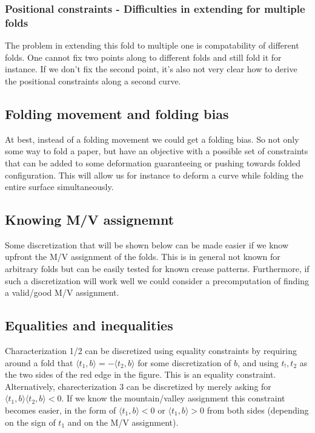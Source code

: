 \documentclass{article}
\theoremstyle{definition}
\begin{document}
\subsubsection{Positional constraints - Difficulties in extending for multiple folds}
The problem in extending this fold to multiple one is compatability of different folds. One cannot fix two points along to different folds and still fold it for instance. If we don't fix the second point, it's also not very clear how to derive the positional constraints along a second curve.

\subsection{Folding movement and folding bias}
At best, instead of a folding movement we could get a folding bias. So not only some way to fold a paper, but have an objective with a possible set of constraints that can be added to some deformation guaranteeing or pushing towards folded configuration. This will allow us for instance to deform a curve while folding the entire surface simultaneously.

\subsection{Knowing M/V assignemnt}
Some discretization that will be shown below can be made easier if we know upfront the M/V assignment of the folds. This is in general not known for arbitrary folds but can be easily tested for known crease patterns. Furthermore, if such a discretization will work well we could consider a precomputation of finding a valid/good M/V assignment.

\subsection{Equalities and inequalities}
Characterization 1/2 can be discretized using equality constraints by requiring around a fold that  $\langle t_1,b \rangle = -\langle t_2,b \rangle$ for some discretization of $b$, and using $t_!,t_2$ as the two sides of the red edge in the figure. This is an equality constraint. Alternatively, charecterization 3 can be discretized by merely asking for $\langle t_1,b \rangle \langle t_2,b \rangle < 0$. If we know the mountain/valley assignment this constraint becomes easier, in the form of $\langle t_1,b \rangle < 0$ or $\langle t_1,b \rangle > 0$ from both sides (depending on the sign of $t_1$ and on the M/V assignment).
\end{document}
